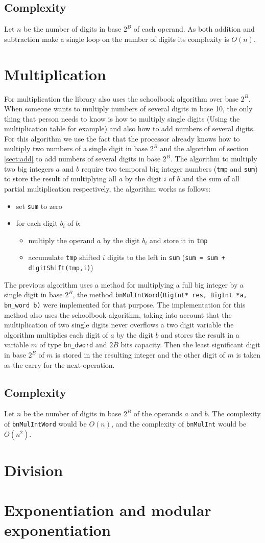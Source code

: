 \documentclass{book}
\begin{document}
\subsection{Complexity}
Let $n$ be the number of digits in base $2^B$ of each operand. As both addition and subtraction make a single loop on the number of digits its complexity is $O(n)$.

\section{Multiplication}
For multiplication the library also uses the schoolbook algorithm over base $2^B$. When someone wants to multiply numbers of several digits in base 10, the only thing that person needs to know is how to multiply single digits (Using the multiplication table for example) and also how to add numbers of several digits. For this algorithm we use the fact that the processor already knows how to multiply two numbers of a single digit in base $2^B$ and the algorithm of section \ref{sect:add} to add numbers of several digits in base $2^B$. The algorithm to multiply two big integers $a$ and $b$ require two temporal big integer numbers (\verb+tmp+ and \verb+sum+) to store the result of multiplying all $a$ by the digit $i$ of $b$ and the sum of all partial multiplication respectively, the algorithm works as follows:

\begin{itemize}
\item set \verb+sum+ to zero
\item for each digit $b_i$ of $b$:
    \begin{itemize}
    \item multiply the operand $a$ by the digit $b_i$ and store it in \verb+tmp+
    \item accumulate \verb+tmp+ shifted $i$ digits to the left in \verb+sum+ (\verb/sum = sum + digitShift(tmp,i)/)
    \end{itemize}
\end{itemize}

The previous algorithm uses a method for multiplying a full big integer by a single digit in base $2^B$, the method \verb+bnMulIntWord(BigInt* res, BigInt *a, bn_word b)+ were implemented for that purpose. The implementation for this method also uses the schoolbook algorithm, taking into account that the multiplication of two single digits never overflows a two digit variable the algorithm multiplies each digit of $a$ by the digit $b$ and stores the result in a variable $m$ of type \verb+bn_dword+ and $2B$ bits capacity. Then the least significant digit in base $2^B$ of $m$ is stored in the resulting integer and the other digit of $m$ is taken as the carry for the next operation.

\subsection{Complexity}
Let $n$ be the number of digits in base $2^B$ of the operands $a$ and $b$. The complexity of \verb+bnMulIntWord+ would be $O(n)$, and the complexity of \verb+bnMulInt+ would be $O(n^2)$.

\section{Division}
 
\section{Exponentiation and modular exponentiation}
\end{document}
